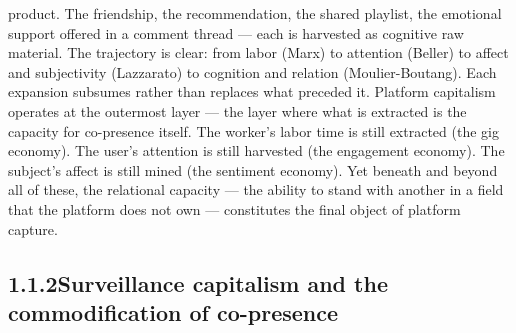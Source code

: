 product. The friendship, the recommendation, the shared playlist, the emotional support offered in a comment thread — each is harvested as cognitive raw material. The trajectory is clear: from labor (Marx) to attention (Beller) to affect and subjectivity (Lazzarato) to cognition and relation (Moulier-Boutang). Each expansion subsumes rather than replaces what preceded it. Platform capitalism operates at the outermost layer — the layer where what is extracted is the capacity for co-presence itself. The worker’s labor time is still extracted (the gig economy). The user’s attention is still harvested (the engagement economy). The subject’s affect is still mined (the sentiment economy). Yet beneath and beyond all of these, the relational capacity — the ability to stand with another in a field that the platform does not own — constitutes the final object of platform capture.

\subsection{1.1.2\quad Surveillance capitalism and the commodification of co-presence}


